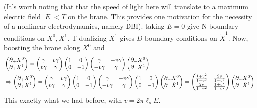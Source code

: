 \documentclass[11pt, class=article, crop=false]{standalone}
\begin{document}
\begin{enumerate}
		 (It's worth noting that that the speed of light here will translate to a maximum electric field $|E| < T$ on the brane. This provides one motivation for the necessity of a nonlinear electrodynamics, namely DBI). 
	 taking $E= 0$ give N boundary conditions on $X^0, X^1$. T-dualizing $X^1$ gives $D$ boundary conditions on $\tilde X^1$. Now, boosting the brane along $X^0$ and  
	\[
	\begin{aligned}
	&\begin{pmatrix}
		\partial_+ X^0\\
		\partial_+ \tilde X^1
	\end{pmatrix}=
		\begin{pmatrix}
			\gamma & v \gamma\\
			v \gamma & \gamma
		\end{pmatrix}
		\begin{pmatrix}
			1 & 0\\
			0 & -1
		\end{pmatrix}
		\begin{pmatrix}
			\gamma & -v \gamma\\
			-v \gamma & \gamma
		\end{pmatrix}
		\begin{pmatrix}
			\partial_- X^0\\
			\partial_- \tilde X^1
		\end{pmatrix}\\
		&\Rightarrow \begin{pmatrix}
		\partial_+ X^0\\
		\partial_+  X^1 
	\end{pmatrix}
	=\begin{pmatrix}
			\gamma & v \gamma\\
			v \gamma & \gamma
		\end{pmatrix}
		\begin{pmatrix}
			1 & 0\\
			0 & -1
		\end{pmatrix}
		\begin{pmatrix}
			\gamma & -v \gamma\\
			-v \gamma & \gamma
		\end{pmatrix}
		\begin{pmatrix}
			1 & 0\\
			0 & -1
		\end{pmatrix}
		\begin{pmatrix}
			\partial_- X^0\\
			\partial_- \tilde X^1
		\end{pmatrix} = \begin{pmatrix}
			\frac{1+v^2}{1-v^2} & \frac{2v}{1-v^2}\\
			\frac{2v}{1-v^2} & \frac{1+v^2}{1-v^2}
		\end{pmatrix}
		\begin{pmatrix}
			\partial_- X^0\\
			\partial_- \tilde X^1
		\end{pmatrix} 
	\end{aligned}
	\]
	This exactly what we had before, with $v = 2 \pi \ell_s E$.
	

\end{enumerate}
\end{document}
